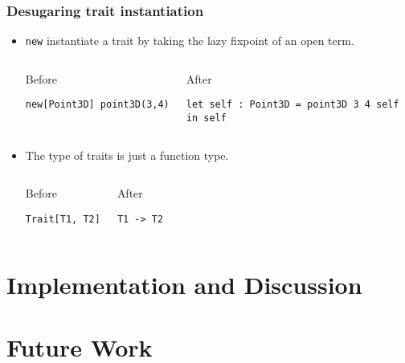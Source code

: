 \documentclass{beamer}
\begin{document}
\begin{frame}[fragile]
  \frametitle{Desugaring trait instantiation}

  \begin{itemize}
  \item \lstinline{new} instantiate a trait by taking the lazy fixpoint of an open term.

  \begin{columns}[t]


  \begin{exampleblock}{Before}
\begin{lstlisting}
new[Point3D] point3D(3,4)
\end{lstlisting}
  \end{exampleblock}


  \begin{exampleblock}{After}
\begin{lstlisting}
let self : Point3D = point3D 3 4 self
in self
\end{lstlisting}
  \end{exampleblock}

  \end{columns}

  \pause

\vskip10pt

 \item The type of traits is just a function type.

  \begin{columns}[t]


  \begin{exampleblock}{Before}
\begin{lstlisting}
Trait[T1, T2]
\end{lstlisting}
  \end{exampleblock}


  \begin{exampleblock}{After}
\begin{lstlisting}
T1 -> T2
\end{lstlisting}
  \end{exampleblock}

  \end{columns}

  \end{itemize}
 



\end{frame}


\section{Implementation and Discussion}

\section{Future Work}
\end{document}
